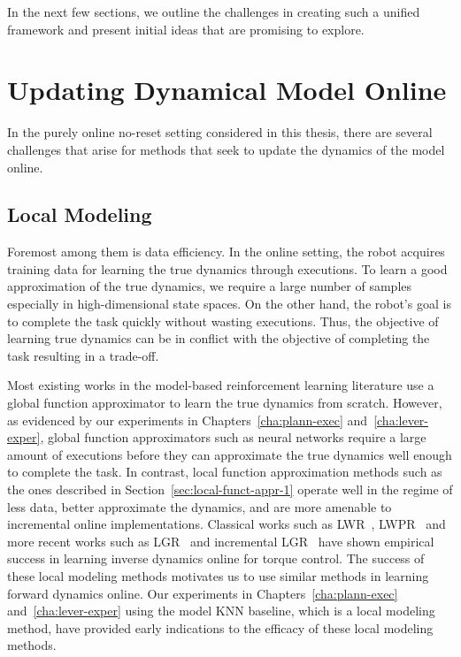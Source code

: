 In the next few sections, we outline the challenges in creating such a
unified framework and present initial ideas that are promising to
explore. 

\section{Updating Dynamical Model Online}
\label{sec:updat-dynam-model}

In the purely online no-reset setting considered in this thesis, there
are several challenges that arise for methods that seek to update the
dynamics of the model online.

\subsection{Local Modeling}
\label{sec:local-modeling}

Foremost among them is data efficiency. In the online setting, the
robot acquires training data for learning the true dynamics through
executions. To learn a good approximation of the true dynamics, we
require a large number of samples especially in high-dimensional state
spaces. On the other hand, the robot's goal is to complete the task
quickly without wasting executions. Thus, the objective of learning
true dynamics can be in conflict with the objective of completing the
task resulting in a trade-off.

Most existing works in the model-based
reinforcement learning literature use a global function
approximator to learn the true dynamics from scratch. However, as
evidenced by our experiments in Chapters~\ref{cha:plann-exec}
and~\ref{cha:lever-exper}, global function approximators such as
neural networks require a large amount of executions before they can
approximate the true dynamics well enough to complete the task. In
contrast, local function approximation methods such as the ones
described in Section~\ref{sec:local-funct-appr-1} operate well in the
regime of less data, better approximate the dynamics, and are more
amenable to incremental online implementations. Classical works such as
LWR~\cite{DBLP:journals/air/AtkesonMS97},
LWPR~\cite{DBLP:conf/icml/VijayakumarS00} and more recent works such
as LGR~\cite{DBLP:journals/corr/MeierHS14} and incremental
LGR~\cite{DBLP:conf/nips/MeierHS14} have shown empirical success in
learning inverse dynamics online for torque
control. The success of these local modeling methods motivates us to
use similar methods in learning forward dynamics online. Our
experiments in Chapters~\ref{cha:plann-exec} and~\ref{cha:lever-exper}
using the model KNN baseline, which is a local modeling method, have
provided early indications to the efficacy of these local modeling
methods.

